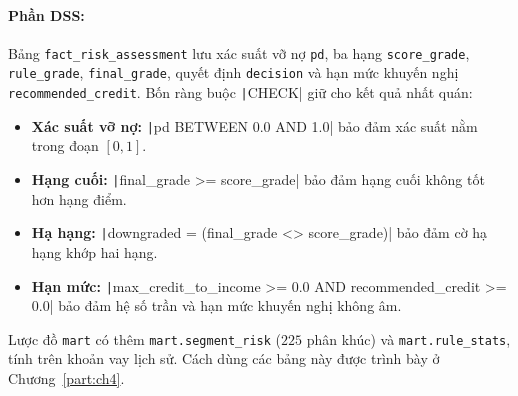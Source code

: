 \paragraph{Phần DSS:}
Bảng \texttt{fact\_risk\_assessment} lưu xác suất vỡ nợ \texttt{pd}, ba hạng \texttt{score\_grade}, \texttt{rule\_grade}, \texttt{final\_grade}, quyết định \texttt{decision} và hạn mức khuyến nghị \texttt{recommended\_credit}. Bốn ràng buộc \texttt|CHECK| giữ cho kết quả nhất quán:
\begin{itemize}[topsep=0pt, itemsep=1pt]
	\item \textbf{Xác suất vỡ nợ:} \texttt|pd BETWEEN 0.0 AND 1.0| bảo đảm xác suất nằm trong đoạn $[0, 1]$.
	\item \textbf{Hạng cuối:} \texttt|final_grade >= score_grade| bảo đảm hạng cuối không tốt hơn hạng điểm.
	\item \textbf{Hạ hạng:} \texttt|downgraded = (final_grade <> score_grade)| bảo đảm cờ hạ hạng khớp hai hạng.
	\item \textbf{Hạn mức:} \texttt|max_credit_to_income >= 0.0 AND recommended_credit >= 0.0| bảo đảm hệ số trần và hạn mức khuyến nghị không âm.
\end{itemize}
Lược đồ \texttt{mart} có thêm \texttt{mart.segment\_risk} ($225$ phân khúc) và \texttt{mart.rule\_stats}, tính trên khoản vay lịch sử. Cách dùng các bảng này được trình bày ở Chương~\ref{part:ch4}.

